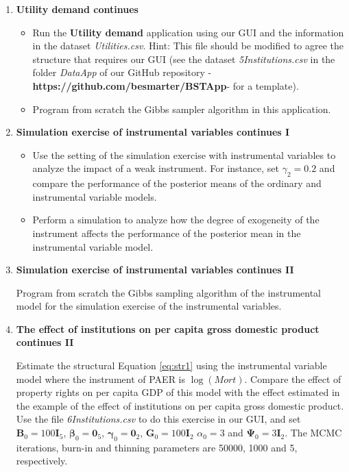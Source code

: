 \begin{enumerate}
\item \textbf{Utility demand continues}

\begin{itemize}
	\item Run the \textbf{Utility demand} application using our GUI and the information in the dataset \textit{Utilities.csv}. Hint: This file should be modified to agree the structure that requires our GUI (see the dataset \textit{5Institutions.csv} in the folder \textit{DataApp} of our GitHub repository -\textbf{https://github.com/besmarter/BSTApp}- for a template).
	\item Program from scratch the Gibbs sampler algorithm in this application.   
\end{itemize}

\item \textbf{Simulation exercise of instrumental variables continues I}

\begin{itemize}
	\item Use the setting of the simulation exercise with instrumental variables to analyze the impact of a weak instrument. For instance, set $\gamma_2 = 0.2$ and compare the performance of the posterior means of the ordinary and instrumental variable models.
	\item Perform a simulation to analyze how the degree of exogeneity of the instrument affects the performance of the posterior mean in the instrumental variable model.
\end{itemize}

\item \textbf{Simulation exercise of instrumental variables continues II}

Program from scratch the Gibbs sampling algorithm of the instrumental model for the simulation exercise of the instrumental variables.

\item \textbf{The effect of institutions on per capita gross domestic product continues II}

Estimate the structural Equation \ref{eq:str1} using the instrumental variable model where the instrument of PAER is $\log(\textit{Mort})$. Compare the effect of property rights on per capita GDP of this model with the effect estimated in the example of the effect of institutions on per capita gross domestic product. Use the file \textit{6Institutions.csv} to do this exercise in our GUI, and set $\bm{B}_0=100\bm{I}_5$, $\bm{\beta}_0=\bm{0}_5$, $\bm{\gamma}_0=\bm{0}_2$, $\bm{G}_0=100\bm{I}_2$ $\alpha_0=3$ and $\bm{\Psi}_0=3\bm{I}_2$. The MCMC iterations, burn-in and thinning parameters are 50000, 1000 and 5, respectively.


\end{enumerate}
